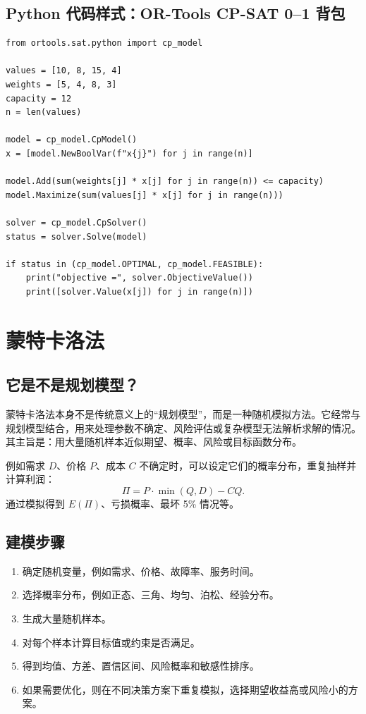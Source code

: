 \documentclass[11pt,a4paper]{ctexart}
\begin{document}
\subsection{Python 代码样式：OR-Tools CP-SAT 0--1 背包}
\begin{lstlisting}
from ortools.sat.python import cp_model

values = [10, 8, 15, 4]
weights = [5, 4, 8, 3]
capacity = 12
n = len(values)

model = cp_model.CpModel()
x = [model.NewBoolVar(f"x{j}") for j in range(n)]

model.Add(sum(weights[j] * x[j] for j in range(n)) <= capacity)
model.Maximize(sum(values[j] * x[j] for j in range(n)))

solver = cp_model.CpSolver()
status = solver.Solve(model)

if status in (cp_model.OPTIMAL, cp_model.FEASIBLE):
    print("objective =", solver.ObjectiveValue())
    print([solver.Value(x[j]) for j in range(n)])
\end{lstlisting}

\section{蒙特卡洛法}

\subsection{它是不是规划模型？}
蒙特卡洛法本身不是传统意义上的“规划模型”，而是一种随机模拟方法。它经常与规划模型结合，用来处理参数不确定、风险评估或复杂模型无法解析求解的情况。其主旨是：用大量随机样本近似期望、概率、风险或目标函数分布。

例如需求 $D$、价格 $P$、成本 $C$ 不确定时，可以设定它们的概率分布，重复抽样并计算利润：
\[
\Pi = P\cdot \min(Q,D)-C Q.
\]
通过模拟得到 $E(\Pi)$、亏损概率、最坏 5\% 情况等。

\subsection{建模步骤}
\begin{enumerate}
\item 确定随机变量，例如需求、价格、故障率、服务时间。
\item 选择概率分布，例如正态、三角、均匀、泊松、经验分布。
\item 生成大量随机样本。
\item 对每个样本计算目标值或约束是否满足。
\item 得到均值、方差、置信区间、风险概率和敏感性排序。
\item 如果需要优化，则在不同决策方案下重复模拟，选择期望收益高或风险小的方案。
\end{enumerate}
\end{document}
